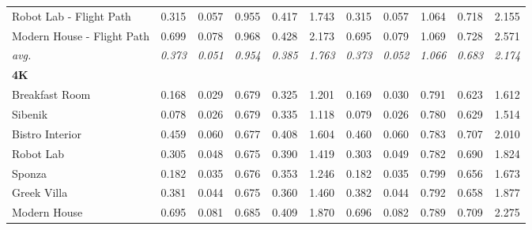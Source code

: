 \begin{table*}
\begin{tabular}{lccccc|ccccc}
Robot Lab - Flight Path       & 0.315              & 0.057          & 0.955          & 0.417          & 1.743          & 0.315              & 0.057          & 1.064          & 0.718          & 2.155          \\
Modern House - Flight Path    & 0.699              & 0.078          & 0.968          & 0.428          & 2.173          & 0.695              & 0.079          & 1.069          & 0.728          & 2.571          \\
\hline
\textit{avg.}                 & \textit{0.373}     & \textit{0.051} & \textit{0.954} & \textit{0.385} & \textit{1.763} & \textit{0.373}     & \textit{0.052} & \textit{1.066} & \textit{0.683} & \textit{2.174} \\
\hline
\textbf{4K}  & & & & & & & & & & \\
Breakfast Room                & 0.168              & 0.029          & 0.679          & 0.325          & 1.201          & 0.169              & 0.030          & 0.791          & 0.623          & 1.612          \\
Sibenik                       & 0.078              & 0.026          & 0.679          & 0.335          & 1.118          & 0.079              & 0.026          & 0.780          & 0.629          & 1.514          \\
Bistro Interior               & 0.459              & 0.060          & 0.677          & 0.408          & 1.604          & 0.460              & 0.060          & 0.783          & 0.707          & 2.010          \\
Robot Lab                     & 0.305              & 0.048          & 0.675          & 0.390          & 1.419          & 0.303              & 0.049          & 0.782          & 0.690          & 1.824          \\
Sponza                        & 0.182              & 0.035          & 0.676          & 0.353          & 1.246          & 0.182              & 0.035          & 0.799          & 0.656          & 1.673          \\
Greek Villa                   & 0.381              & 0.044          & 0.675          & 0.360          & 1.460          & 0.382              & 0.044          & 0.792          & 0.658          & 1.877          \\
Modern House                  & 0.695              & 0.081          & 0.685          & 0.409          & 1.870          & 0.696              & 0.082          & 0.789          & 0.709          & 2.275          \\

\end{tabular}
\end{table*}
